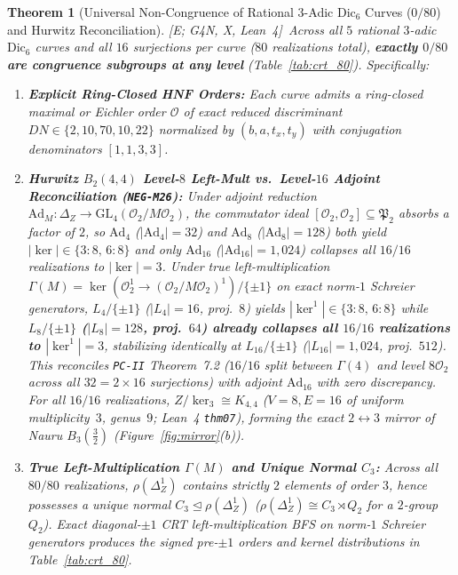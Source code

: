 \documentclass[11pt]{amsart}
\numberwithin{equation}{section}
\theoremstyle{plain}
\newtheorem{theorem}{Theorem}[section]
\theoremstyle{definition}\newtheorem{definition}[theorem]{Definition}
\theoremstyle{remark}\newtheorem{remark}[theorem]{Remark}
\newcommand{\calO}{\mathcal{O}}
\newcommand{\frP}{\mathfrak{P}}
\newcommand{\GL}{\mathrm{GL}}
\newcommand{\Dic}{\mathrm{Dic}}
\newcommand{\Ad}{\mathrm{Ad}}
\newcommand{\ctag}[1]{\textup{\textsf{\scriptsize[#1]}}}
\begin{document}
\begin{theorem}[Universal Non-Congruence of Rational $3$-Adic $\Dic_6$ Curves ($0/80$) and Hurwitz Reconciliation]\label{thm:dic6_noncong}
\ctag{E; G4N, X, Lean~4}\ Across all $5$ rational $3$-adic $\Dic_6$ curves and all $16$ surjections per curve ($80$ realizations total), \textbf{exactly $0/80$ are congruence subgroups at any level} (Table~\ref{tab:crt_80}). Specifically:
\begin{enumerate}[label=(\arabic*),nosep]
\item \textbf{Explicit Ring-Closed HNF Orders:} Each curve admits a ring-closed maximal or Eichler order $\calO$ of exact reduced discriminant $DN\in\{2,10,70,10,22\}$ normalized by $(b,a,t_x,t_y)$ with conjugation denominators $[1,1,3,3]$.
\item \textbf{Hurwitz $B_2(4,4)$ Level-$8$ Left-Mult vs.\ Level-$16$ Adjoint Reconciliation (\textup{\texttt{NEG-M26}}):} Under \emph{adjoint} reduction $\Ad_M : \Delta_Z \to \GL_4(\calO_2/M\calO_2)$, the commutator ideal $[\calO_2,\calO_2]\subseteq\frP_2$ absorbs a factor of $2$, so $\Ad_4$ ($|\Ad_4|=32$) and $\Ad_8$ ($|\Ad_8|=128$) both yield $|\ker|\in\{3:8,\,6:8\}$ and only $\Ad_{16}$ ($|\Ad_{16}|=1{,}024$) collapses all $16/16$ realizations to $|\ker|=3$. Under \emph{true left-multiplication} $\Gamma(M) = \ker(\calO_2^1 \to (\calO_2/M\calO_2)^1)/\{\pm 1\}$ on exact norm-$1$ Schreier generators, $L_4/\{\pm 1\}$ ($|L_4|=16$, proj.\ $8$) yields $|\ker^1|\in\{3:8,\,6:8\}$ while \textbf{$L_8/\{\pm 1\}$ ($|L_8|=128$, proj.\ $64$) already collapses all $16/16$ realizations to $|\ker^1|=3$}, stabilizing identically at $L_{16}/\{\pm 1\}$ ($|L_{16}|=1{,}024$, proj.\ $512$). This reconciles \texttt{PC-II} Theorem~7.2 \cite{ergentics2026pc2} ($16/16$ split between $\Gamma(4)$ and level $8\calO_2$ across all $32=2\times 16$ surjections) with adjoint $\Ad_{16}$ with zero discrepancy. For all $16/16$ realizations, $Z/\ker_3 \cong K_{4,4}$ ($V=8, E=16$ of uniform multiplicity~$3$, genus~$9$; Lean~4 \texttt{thm07}), forming the exact $2\leftrightarrow 3$ mirror of Nauru $B_3(\frac{3}{2})$ (Figure~\ref{fig:mirror}(b)).
\item \textbf{True Left-Multiplication $\Gamma(M)$ and Unique Normal $C_3$:} Across all $80/80$ realizations, $\rho(\Delta_Z^1)$ contains strictly $2$ elements of order $3$, hence possesses a unique normal $C_3 \trianglelefteq \rho(\Delta_Z^1)$ ($\rho(\Delta_Z^1) \cong C_3 \rtimes Q_2$ for a $2$-group $Q_2$). Exact diagonal-$\pm 1$ CRT left-multiplication BFS on norm-$1$ Schreier generators produces the signed pre-$\pm 1$ orders and kernel distributions in Table~\ref{tab:crt_80}.

\end{enumerate}
\end{theorem}
\end{document}
